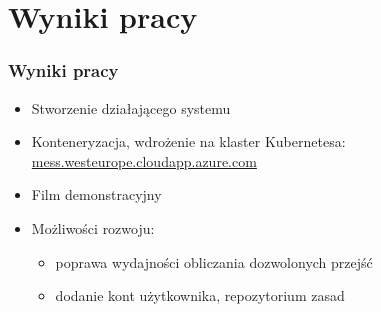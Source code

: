 \documentclass{beamer}
\begin{document}
\section{Wyniki pracy}

\begin{frame}
	\frametitle{Wyniki pracy}
	\begin{itemize}
		\item Stworzenie działającego systemu
		\item Konteneryzacja, wdrożenie na klaster Kubernetesa: \url{mess.westeurope.cloudapp.azure.com}
		\item Film demonstracyjny
		\item Możliwości rozwoju:
		\begin{itemize}
			\item poprawa wydajności obliczania dozwolonych przejść
			\item dodanie kont użytkownika, repozytorium zasad
		\end{itemize}
	\end{itemize}
\end{frame}





\end{document}
